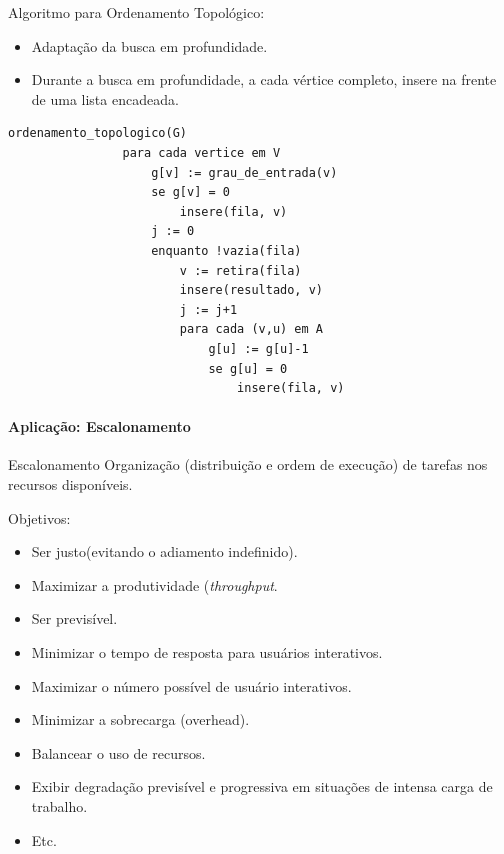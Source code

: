 \begin{frame}[fragile]
	Algoritmo para Ordenamento Topológico:
	
	\begin{itemize}
		\item Adaptação da busca em profundidade.
		\item Durante a busca em profundidade, a cada vértice completo, insere na 
		frente de uma lista encadeada.
	\end{itemize}
	
	\begin{center}
		\begin{minipage}{.7\textwidth}
			\begin{lstlisting}[morekeywords={ord_top,v_node_t, processa, vizinho, processado, insere}]
			ordenamento_topologico(G)
				para cada vertice em V
				    g[v] := grau_de_entrada(v)
				    se g[v] = 0
				        insere(fila, v)
				    j := 0
				    enquanto !vazia(fila)
				        v := retira(fila)
				        insere(resultado, v)
				        j := j+1
				        para cada (v,u) em A
				            g[u] := g[u]-1
				            se g[u] = 0
				                insere(fila, v)
			\end{lstlisting}
		\end{minipage}
	\end{center}
\end{frame}

\begin{frame}
	\framesubtitle{Aplicação: Escalonamento}
	
	\pause
	\begin{block}{Escalonamento}
		Organização (distribuição e ordem de execução) de tarefas nos recursos disponíveis.
	\end{block}
	\pause
	Objetivos:
	\begin{itemize}
		\item Ser justo(evitando o adiamento indefinido).
		\item Maximizar a produtividade (\emph{throughput}.
		\item Ser previsível.
		\item Minimizar o tempo de resposta para usuários interativos.
		\item Maximizar o número possível de usuário interativos.
		\item Minimizar a sobrecarga (overhead).
		\item Balancear o uso de recursos.
		\item Exibir degradação previsível e progressiva em situações de intensa 
		carga de trabalho.
		\item Etc.
	\end{itemize}
\end{frame}

